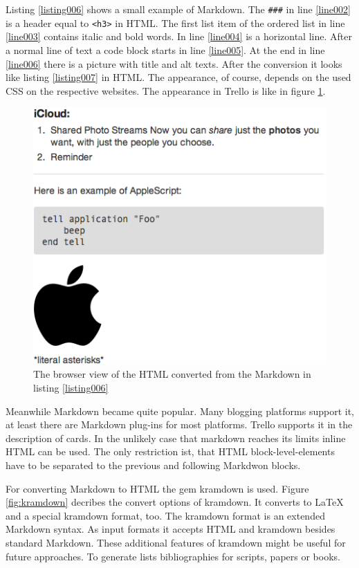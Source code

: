  

Listing \ref{listing006} shows a small example of Markdown. The \lstinline{###} in line \ref{line002} is a header equal to \lstinline{<h3>} in HTML. The first list item of the ordered list in line \ref{line003} contains italic and bold words. In line \ref{line004} is a horizontal line. After a normal line of text a code block starts in line \ref{line005}. At the end in line \ref{line006} there is a picture with title and alt texts. After the conversion it looks like listing \ref{listing007} in HTML. The appearance, of course, depends on the used CSS on the respective websites. The appearance in Trello is like in figure \ref{fig:markdown-result}.

\begin{figure}[htb]
\centering
\includegraphics[scale=0.6]{figures/markdown-result}
\caption{The browser view of the HTML converted from the Markdown in listing \ref{listing006}}
\label{fig:markdown-result}
\end{figure}

Meanwhile Markdown became quite popular. Many blogging platforms support it, at least there are Markdown plug-ins for most platforms. Trello supports it in the description of cards. In the unlikely case that markdown reaches its limits inline HTML can be used. The only restriction ist, that HTML block-level-elements have to be separated to the previous and following Markdwon blocks.

For converting Markdown to HTML the gem kramdown is used. Figure \ref{fig:kramdown} decribes the convert options of kramdown. It converts to LaTeX and a special kramdown format, too. The kramdown format is an extended Markdown syntax. As input formats it accepts HTML and kramdown besides standard Markdown. \cite{kramdown} These additional features of kramdown might be useful for future approaches. To generate lists bibliographies for scripts, papers or books.

